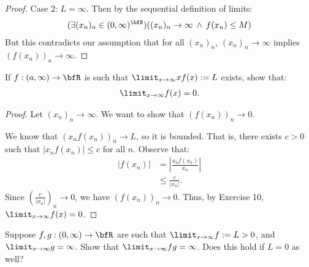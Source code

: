 \documentclass[11pt,twoside,openany]{memoir}
\begin{document}
\begin{proof}
            Case 2: $L = \infty$. Then by the sequential definition of limits:
                \begin{equation*}
                \begin{split}
                    (\exists (x_n)_n \in (0,\infty)^\bfN)((x_n)_n \rightarrow \infty \hspace{2pt}\land\hspace{2pt} f(x_n) \leq M )
                \end{split}
                \end{equation*}
            But this contradicts our assumption that for all $(x_n)_n$, $(x_n)_n \rightarrow \infty$ implies $(f(x_n))_n \rightarrow \infty$.
        \end{proof}
    \begin{exercise}
         If $f:(a,\infty)\rightarrow \bfR$ is such that $\limit_{x \rightarrow \infty}xf(x) := L$ exists, show that:
            \begin{equation*}
            \begin{split}
                \limit_{x \rightarrow \infty}f(x) = 0.
            \end{split}
            \end{equation*}
    \end{exercise}
        \begin{proof}
            Let $(x_n)_n \rightarrow \infty$. We want to show that $(f(x_n))_n \rightarrow 0$. \nl
            
            We know that $(x_n f(x_n))_n \rightarrow L$, so it is bounded. That is, there exists $c > 0$ such that $|x_n f(x_n)| \leq c$ for all $n$. Observe that:
                \begin{equation*}
                \begin{split}
                    |f(x_n)| 
                    & = \left|\frac{x_n f(x_n)}{x_n}\right| \\
                    & \leq \frac{c}{|x_n|}. 
                \end{split}
                \end{equation*}
            Since $\left(\frac{c}{|x_n|}\right)_n \rightarrow 0$, we have $(f(x_n))_n \rightarrow 0$. Thus, by Exercise 10, $\limit_{x \rightarrow \infty}f(x) = 0$.
        \end{proof}
    \begin{exercise}
        Suppose $f,g:(0,\infty) \rightarrow \bfR$ are such that $\limit_{x \rightarrow \infty} f := L > 0$, and $\limit_{x \rightarrow \infty}g = \infty$. Show that $\limit_{x \rightarrow \infty}fg = \infty$. Does this hold if $L = 0$ as well?
    \end{exercise}
\end{document}
